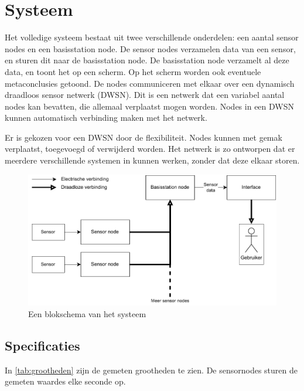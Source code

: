 \section{Systeem}
Het volledige systeem bestaat uit twee verschillende onderdelen: een aantal sensor nodes en een basisstation node.
De sensor nodes verzamelen data van een sensor, en sturen dit naar de basisstation node. De basisstation node verzamelt al deze data, en toont het op een scherm. Op het scherm worden ook eventuele metaconclusies getoond.
De nodes communiceren met elkaar over een dynamisch draadloos sensor netwerk (DWSN).
Dit is een netwerk dat een variabel aantal nodes kan bevatten, die allemaal verplaatst mogen worden. Nodes in een DWSN kunnen automatisch verbinding maken met het netwerk.

Er is gekozen voor een DWSN door de flexibiliteit. Nodes kunnen met gemak verplaatst, toegevoegd of verwijderd worden. Het netwerk is zo ontworpen dat er meerdere verschillende systemen in kunnen werken, zonder dat deze  elkaar storen.

\begin{figure}[ht]
    \centering
    \includegraphics{img/fullsystem.pdf}
    \caption{Een blokschema van het systeem}
    \label{fig:fullsystem}
\end{figure}

\subsection{Specificaties}

In \autoref{tab:grootheden} zijn de gemeten grootheden te zien.
De sensornodes sturen de gemeten waardes elke seconde op. 

